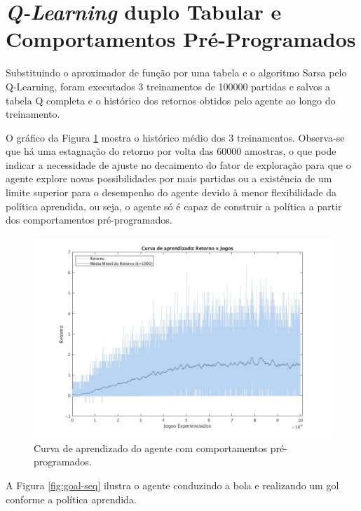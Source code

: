 \section{\textit{Q-Learning} duplo Tabular e Comportamentos Pré-Programados}
\label{sec:behaviors-tabular}
Substituindo o aproximador de função por uma tabela e o algoritmo Sarsa pelo Q-Learning, foram executados 3 treinamentos de 100000 partidas e salvos a tabela Q completa e o histórico dos retornos obtidos pelo agente ao longo do treinamento.

O gráfico da Figura \ref{fig:single-agent-tabular-behaviors} mostra o histórico médio dos 3 treinamentos. Observa-se que
há uma estagnação do retorno por volta das 60000 amostras, o que pode indicar a necessidade de ajuste no decaimento do fator de exploração para que o agente explore novas possibilidades por mais partidas ou a existência de um limite superior para o desempenho do agente devido à menor flexibilidade da política aprendida, ou seja, o agente só é capaz de construir a política a partir dos comportamentos pré-programados.

\begin{figure}[H]
	\includegraphics[width=0.9\linewidth]{figs/curva-behaviors-tabular.jpg}
	\centering
	\caption{Curva de aprendizado do agente com comportamentos pré-programados.}
	\label{fig:single-agent-tabular-behaviors}
\end{figure}

A Figura \ref{fig:goal-seq} ilustra o agente conduzindo a bola e realizando um gol conforme a política aprendida.

